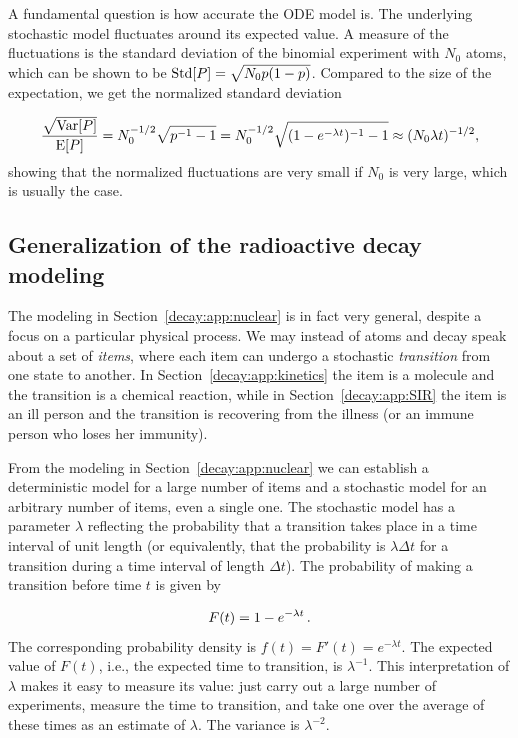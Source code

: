 \documentclass[%
oneside,                 %
final,                   %
10pt]{article}
\begin{document}
A fundamental question is how accurate the ODE model is. The underlying
stochastic model fluctuates around its expected value. A measure
of the fluctuations is the standard deviation of the binomial experiment with
$N_0$ atoms, which can be shown to be $\Std{P}=\sqrt{N_0p(1-p)}$. Compared
to the size of the expectation, we get
the normalized standard deviation

\[ \frac{\sqrt{\Var{P}}}{\E{P}} = N_0^{-1/2}\sqrt{p^{-1}-1}
= N_0^{-1/2}\sqrt{(1-e^{-\lambda t})^{-1}-1}\approx
(N_0\lambda t)^{-1/2},
\]
showing that the normalized fluctuations are very small if $N_0$ is
very large, which is usually the case.

\subsection{Generalization of the radioactive decay modeling}
\label{decay:app:waitingtime}

The modeling in Section~\ref{decay:app:nuclear} is in fact very
general, despite a focus on a particular physical process. We may
instead of atoms and decay speak about a set of \emph{items}, where each
item can undergo a stochastic \emph{transition} from one state to
another. In Section~\ref{decay:app:kinetics} the item is a molecule and
the transition is a chemical reaction, while in Section~\ref{decay:app:SIR} the item is an ill person and the transition is
recovering from the illness (or an immune person who loses her
immunity).

From the modeling in Section~\ref{decay:app:nuclear} we can establish
a deterministic model for a large number of items and a stochastic
model for an arbitrary number of items, even a single one.
The stochastic model has a parameter $\lambda$ reflecting the
probability that a transition takes place in a time interval of
unit length (or equivalently, that the probability is $\lambda\Delta t$
for a transition during a time interval of length $\Delta t$).
The probability of making a transition before time $t$ is given by

\[ F(t) = 1- e^{-\lambda t}\tp\]
The corresponding probability density is $f(t)=F'(t)=e^{-\lambda t}$.
The expected value of $F(t)$, i.e., the expected time to transition,
is $\lambda^{-1}$. This interpretation of $\lambda$ makes it easy to
measure its value: just carry out a large number of experiments,
measure the time to transition, and take one over the average of these times as
an estimate of $\lambda$.
The variance is $\lambda^{-2}$.
\end{document}
